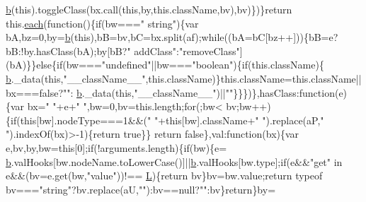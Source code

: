 \begin{DoxyCode}
      \hyperlink{docs_2_programmer's_manual_2html_2jquery_8js_aa4026ad5544b958e54ce5e106fa1c805}{b}(\textcolor{keyword}{this}).toggleClass(bx.call(\textcolor{keyword}{this},by,\textcolor{keyword}{this}.className,bv),bv)\})\}\textcolor{keywordflow}{return} this.\hyperlink{docs_2_programmer's_manual_2html_2jquery_8js_a871ff39db627c54c710a3e9909b8234c}{each}(\textcolor{keyword}{function}()\{\textcolor{keywordflow}{if}(bw===\textcolor{stringliteral}{"
      string"})\{var bA,bz=0,by=\hyperlink{docs_2_programmer's_manual_2html_2jquery_8js_aa4026ad5544b958e54ce5e106fa1c805}{b}(\textcolor{keyword}{this}),bB=bv,bC=bx.split(af);\textcolor{keywordflow}{while}((bA=bC[bz++]))\{bB=e?bB:!by.hasClass(bA);by[bB?\textcolor{stringliteral}{"
      addClass"}:\textcolor{stringliteral}{"removeClass"}](bA)\}\}\textcolor{keywordflow}{else}\{\textcolor{keywordflow}{if}(bw===\textcolor{stringliteral}{"undefined"}||bw===\textcolor{stringliteral}{"boolean"})\{\textcolor{keywordflow}{if}(this.className)\{
      \hyperlink{docs_2_programmer's_manual_2html_2jquery_8js_aa4026ad5544b958e54ce5e106fa1c805}{b}.\_data(\textcolor{keyword}{this},\textcolor{stringliteral}{"\_\_className\_\_"},this.className)\}this.className=this.className||bx===\textcolor{keyword}{false}?\textcolor{stringliteral}{""}:
      \hyperlink{docs_2_programmer's_manual_2html_2jquery_8js_aa4026ad5544b958e54ce5e106fa1c805}{b}.\_data(\textcolor{keyword}{this},\textcolor{stringliteral}{"\_\_className\_\_"})||\textcolor{stringliteral}{""}\}\}\})\},hasClass:\textcolor{keyword}{function}(e)\{var bx=\textcolor{stringliteral}{" "}+e+\textcolor{stringliteral}{" "},bw=0,bv=this.length;\textcolor{keywordflow}{for}(;bw<
      bv;bw++)\{\textcolor{keywordflow}{if}(\textcolor{keyword}{this}[bw].nodeType===1&&(\textcolor{stringliteral}{" "}+\textcolor{keyword}{this}[bw].className+\textcolor{stringliteral}{" "}).replace(aP,\textcolor{stringliteral}{" "}).indexOf(bx)>-1)\{\textcolor{keywordflow}{return} \textcolor{keyword}{true}\}\}\textcolor{keywordflow}{
      return} \textcolor{keyword}{false}\},val:\textcolor{keyword}{function}(bx)\{var e,bv,by,bw=\textcolor{keyword}{this}[0];\textcolor{keywordflow}{if}(!arguments.length)\{\textcolor{keywordflow}{if}(bw)\{e=
      \hyperlink{docs_2_programmer's_manual_2html_2jquery_8js_aa4026ad5544b958e54ce5e106fa1c805}{b}.valHooks[bw.nodeName.toLowerCase()]||\hyperlink{docs_2_programmer's_manual_2html_2jquery_8js_aa4026ad5544b958e54ce5e106fa1c805}{b}.valHooks[bw.type];\textcolor{keywordflow}{if}(e&&\textcolor{stringliteral}{"get"} in e&&(bv=e.get(bw,\textcolor{stringliteral}{"value"}))!==
      \hyperlink{docs_2_programmer's_manual_2html_2jquery_8js_a38ee4c0b5f4fe2a18d0c783af540d253}{L})\{\textcolor{keywordflow}{return} bv\}bv=bw.value;\textcolor{keywordflow}{return} typeof bv===\textcolor{stringliteral}{"string"}?bv.replace(aU,\textcolor{stringliteral}{""}):bv==null?\textcolor{stringliteral}{""}:bv\}\textcolor{keywordflow}{return}\}by=

\end{DoxyCode}
